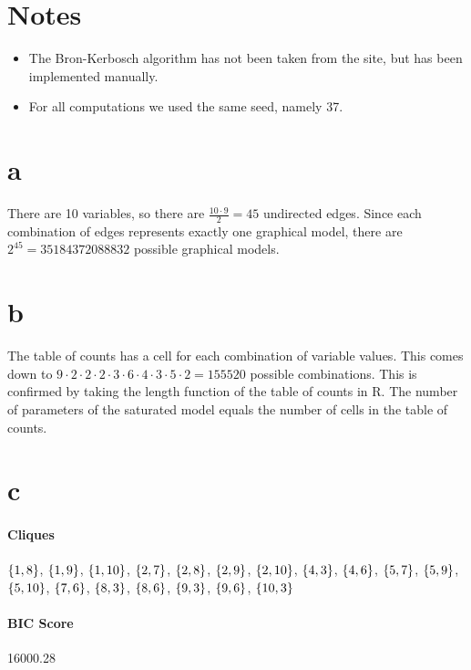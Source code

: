 \documentclass[12pt]{article}
\theoremstyle{definition}
\begin{document}
\maketitle

\section*{Notes}
\begin{itemize}
    \item The Bron-Kerbosch algorithm has not been taken from the site, but has been implemented manually.
    \item For all computations we used the same seed, namely 37.
\end{itemize}

\section*{a}
There are 10 variables, so there are $\frac{10 \cdot 9}{2} = 45$ undirected edges.
Since each combination of edges represents exactly one graphical model,
there are $2^{45} = 35184372088832$ possible graphical models.

\section*{b}
The table of counts has a cell for each combination of variable values.
This comes down to $9 \cdot 2 \cdot 2 \cdot 2 \cdot 3 \cdot 6 \cdot 4 \cdot 3 \cdot 5 \cdot 2 = 155520$ possible combinations.
This is confirmed by taking the length function of the table of counts in R.
The number of parameters of the saturated model equals the number of cells in the table of counts.

\section*{c}
\paragraph{Cliques}
$\set{1,8}$, $\set{1,9}$, $\set{1,10}$, $\set{2,7}$, $\set{2,8}$, $\set{2,9}$, $\set{2,10}$,
$\set{4,3}$, $\set{4,6}$, $\set{5,7}$, $\set{5,9}$, $\set{5,10}$, $\set{7,6}$, $\set{8,3}$,
$\set{8,6}$, $\set{9,3}$, $\set{9,6}$, $\set{10,3}$

\paragraph{BIC Score} 16000.28
\end{document}
